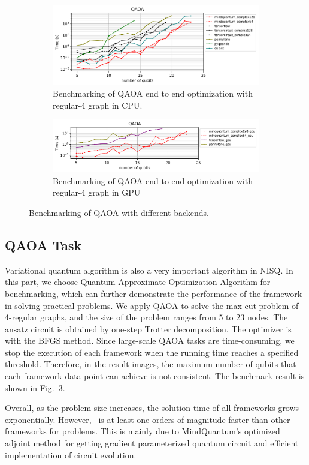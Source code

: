 \begin{figure}
    \centering
    \begin{subfigure}{0.9\textwidth}
        \centering
        \includegraphics[width=\textwidth]{images/7_QAOA_CPU.png}
        \caption{Benchmarking of QAOA end to end optimization with regular-4 graph in CPU.}
        \label{7_regular_4_cpu}
    \end{subfigure}
    \begin{subfigure}{0.9\textwidth}
        \centering
        \includegraphics[width=\textwidth]{images/7_QAOA_GPU.png}
        \caption{Benchmarking of QAOA end to end optimization with regular-4 graph in GPU}
        \label{7_regular_4_gpu}
    \end{subfigure}
    \caption{Benchmarking of QAOA with different backends.}
    \label{fig:benchmark_qaoa}
\end{figure}

\subsection{QAOA Task}

Variational quantum algorithm is also a very important algorithm in NISQ. In this part, we choose Quantum Approximate Optimization Algorithm for benchmarking, which can further demonstrate the performance of the framework in solving practical problems. We apply QAOA to solve the max-cut problem of 4-regular graphs, and the size of the problem ranges from 5 to 23 nodes. The ansatz circuit is obtained by one-step Trotter decomposition. The optimizer is  with the BFGS method. Since large-scale QAOA tasks are time-consuming, we stop the execution of each framework when the running time reaches a specified threshold. Therefore, in the result images, the maximum number of qubits that each framework data point can achieve is not consistent. The benchmark result is shown in Fig.~\ref{fig:benchmark_qaoa}.

Overall, as the problem size increases, the solution time of all frameworks grows exponentially. However, \MindQuantum\ is at least one orders of magnitude faster than other frameworks for problems. This is mainly due to MindQuantum's optimized adjoint method for getting gradient parameterized quantum circuit and efficient implementation of circuit evolution.
